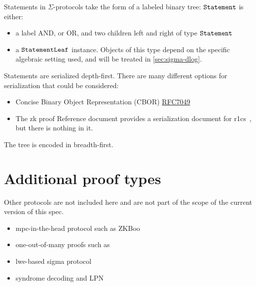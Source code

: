 \documentclass[11pt]{article}
\begin{document}
Statements in $\Sigma$-protocols take the form of a labeled binary tree:
$\texttt{Statement}$ is either:
\begin{itemize}
  \item a label \textsf{AND}, or \textsf{OR}, and two children \textsf{left} and \textsf{right} of type $\texttt{Statement}$
  \item a $\texttt{StatementLeaf}$ instance. Objects of this type depend on the specific algebraic setting used, and will be treated in \cref{sec:sigma-dlog}.
\end{itemize}
Statements are serialized depth-first.
  There are many different options for serialization that could be considered:
  \begin{itemize}
  \item Concise Binary Object Representation (CBOR) \href{https://datatracker.ietf.org/doc/html/rfc7049}{RFC7049}
    \item The zk proof Reference document provides a serialization document for r1cs~\cite[3.4.2]{zkproof-reference}, but there is nothing in it.
\end{itemize}
The tree is encoded in breadth-first.



\section{Additional proof types}

Other protocols are not included here and are not part of the scope of the current version of this spec.
\begin{itemize}
\item mpc-in-the-head protocol such as ZKBoo~\cite{USENIX:GiaMadOrl16}
\item one-out-of-many proofs such as~\cite{EC:GroKoh15}
\item lwe-based sigma protocol~\cite{C:AttCraKoh21} 
\item syndrome decoding and LPN~\cite{C:Stern93,AC:JKPT12}
\end{itemize}



\end{document}
